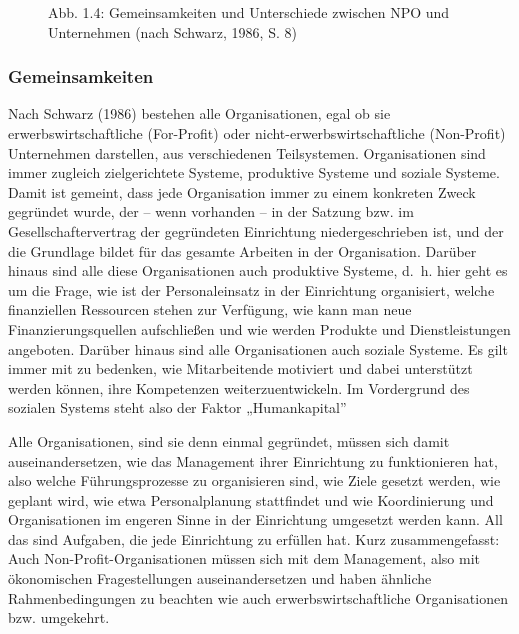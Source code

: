 \documentclass[
  letterpaper,
]{book}
\makeatletter
\newcommand*\pandocbounded[1]{%
  \sbox\pandoc@box{#1}%
  \Gscale@div\@tempa{\textheight}{\dimexpr\ht\pandoc@box+\dp\pandoc@box\relax}%
  \Gscale@div\@tempb{\linewidth}{\wd\pandoc@box}%
  \ifdim\@tempb\p@<\@tempa\p@\let\@tempa\@tempb\fi%
  \ifdim\@tempa\p@<\p@\scalebox{\@tempa}{\usebox\pandoc@box}%
  \else\usebox{\pandoc@box}%
  \fi%
}
\makeatother
\begin{document}
\begin{figure}

\pandocbounded{\texttt{[image: images/figure14.png]}} \hfill{}

\caption{Abb. 1.4: Gemeinsamkeiten und Unterschiede zwischen NPO und
Unternehmen (nach Schwarz, 1986, S. 8)}

\end{figure}%

\subsubsection{Gemeinsamkeiten}\label{npogemeinsamkeiten}

Nach Schwarz (1986) bestehen alle Organisationen, egal ob sie
erwerbswirtschaftliche (For-Profit) oder nicht-erwerbswirtschaftliche
(Non-Profit) Unternehmen darstellen, aus verschiedenen Teilsystemen.
Organisationen sind immer zugleich zielgerichtete Systeme, produktive
Systeme und soziale Systeme. Damit ist gemeint, dass jede Organisation
immer zu einem konkreten Zweck gegründet wurde, der -- wenn vorhanden --
in der Satzung bzw. im Gesellschaftervertrag der gegründeten Einrichtung
niedergeschrieben ist, und der die Grundlage bildet für das gesamte
Arbeiten in der Organisation. Darüber hinaus sind alle diese
Organisationen auch produktive Systeme, d.~h. hier geht es um die Frage,
wie ist der Personaleinsatz in der Einrichtung organisiert, welche
finanziellen Ressourcen stehen zur Verfügung, wie kann man neue
Finanzierungsquellen aufschließen und wie werden Produkte und
Dienstleistungen angeboten. Darüber hinaus sind alle Organisationen auch
soziale Systeme. Es gilt immer mit zu bedenken, wie Mitarbeitende
motiviert und dabei unterstützt werden können, ihre Kompetenzen
weiterzuentwickeln. Im Vordergrund des sozialen Systems steht also der
Faktor „Humankapital''

Alle Organisationen, sind sie denn einmal gegründet, müssen sich damit
auseinandersetzen, wie das Management ihrer Einrichtung zu funktionieren
hat, also welche Führungsprozesse zu organisieren sind, wie Ziele
gesetzt werden, wie geplant wird, wie etwa Personalplanung stattfindet
und wie Koordinierung und Organisationen im engeren Sinne in der
Einrichtung umgesetzt werden kann. All das sind Aufgaben, die jede
Einrichtung zu erfüllen hat. Kurz zusammengefasst: Auch
Non-Profit-Organisationen müssen sich mit dem Management, also mit
ökonomischen Fragestellungen auseinandersetzen und haben ähnliche
Rahmenbedingungen zu beachten wie auch erwerbswirtschaftliche
Organisationen bzw. umgekehrt.
\end{document}
